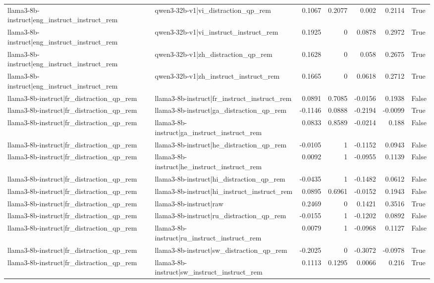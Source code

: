 \begin{table}
\begin{tabular}{l l r r r r l}
llama3-8b-instruct|eng_instruct_instruct_rem & qwen3-32b-v1|vi_distraction_qp_rem & 0.1067 & 0.2077 & 0.002 & 0.2114 & True \\
llama3-8b-instruct|eng_instruct_instruct_rem & qwen3-32b-v1|vi_instruct_instruct_rem & 0.1925 & 0 & 0.0878 & 0.2972 & True \\
llama3-8b-instruct|eng_instruct_instruct_rem & qwen3-32b-v1|zh_distraction_qp_rem & 0.1628 & 0 & 0.058 & 0.2675 & True \\
llama3-8b-instruct|eng_instruct_instruct_rem & qwen3-32b-v1|zh_instruct_instruct_rem & 0.1665 & 0 & 0.0618 & 0.2712 & True \\
llama3-8b-instruct|fr_distraction_qp_rem & llama3-8b-instruct|fr_instruct_instruct_rem & 0.0891 & 0.7085 & -0.0156 & 0.1938 & False \\
llama3-8b-instruct|fr_distraction_qp_rem & llama3-8b-instruct|ga_distraction_qp_rem & -0.1146 & 0.0888 & -0.2194 & -0.0099 & True \\
llama3-8b-instruct|fr_distraction_qp_rem & llama3-8b-instruct|ga_instruct_instruct_rem & 0.0833 & 0.8589 & -0.0214 & 0.188 & False \\
llama3-8b-instruct|fr_distraction_qp_rem & llama3-8b-instruct|he_distraction_qp_rem & -0.0105 & 1 & -0.1152 & 0.0943 & False \\
llama3-8b-instruct|fr_distraction_qp_rem & llama3-8b-instruct|he_instruct_instruct_rem & 0.0092 & 1 & -0.0955 & 0.1139 & False \\
llama3-8b-instruct|fr_distraction_qp_rem & llama3-8b-instruct|hi_distraction_qp_rem & -0.0435 & 1 & -0.1482 & 0.0612 & False \\
llama3-8b-instruct|fr_distraction_qp_rem & llama3-8b-instruct|hi_instruct_instruct_rem & 0.0895 & 0.6961 & -0.0152 & 0.1943 & False \\
llama3-8b-instruct|fr_distraction_qp_rem & llama3-8b-instruct|raw & 0.2469 & 0 & 0.1421 & 0.3516 & True \\
llama3-8b-instruct|fr_distraction_qp_rem & llama3-8b-instruct|ru_distraction_qp_rem & -0.0155 & 1 & -0.1202 & 0.0892 & False \\
llama3-8b-instruct|fr_distraction_qp_rem & llama3-8b-instruct|ru_instruct_instruct_rem & 0.0079 & 1 & -0.0968 & 0.1127 & False \\
llama3-8b-instruct|fr_distraction_qp_rem & llama3-8b-instruct|sw_distraction_qp_rem & -0.2025 & 0 & -0.3072 & -0.0978 & True \\
llama3-8b-instruct|fr_distraction_qp_rem & llama3-8b-instruct|sw_instruct_instruct_rem & 0.1113 & 0.1295 & 0.0066 & 0.216 & True \\

\end{tabular}
\end{table}

